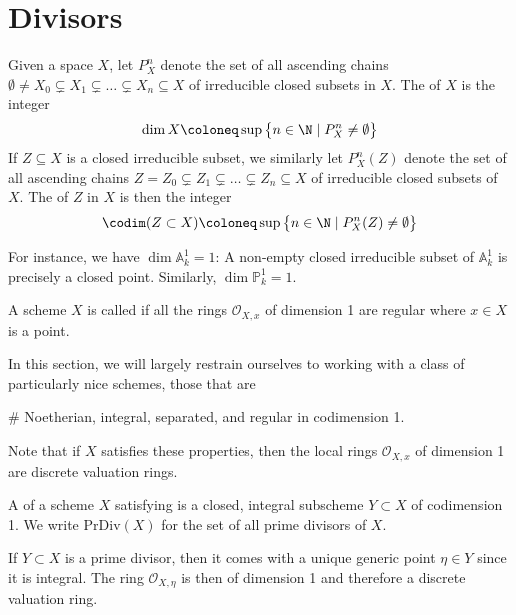 \documentclass[wip, algebra]{bsteffan-lecturenotes}
\newcommand{\cO}{\mathcal{O}}
\newcommand{\A}{\mathbb{A}}
\renewcommand{\P}{\mathbb{P}}
\newcommand{\PrDiv}{\mathrm{PrDiv}}
\begin{document}
\section{Divisors}
\begin{definition}
	Given a space $X$, let $P_X^n$ denote the set of all ascending chains $\emptyset \neq X_0 \subsetneq X_1 \subsetneq \ldots \subsetneq X_n \subseteq X$ of irreducible closed subsets in $X$.  
	The  of $X$ is the integer
	\begin{equation*}
		\dim X \coloneq \sup \big\{n \in \N \mid P^n_X \neq \emptyset\big\}
	\end{equation*}
	If $Z \subseteq X$ is a closed irreducible subset, we similarly let $P_X^n(Z)$ denote the set of all ascending chains $Z = Z_0 \subsetneq Z_1 \subsetneq \ldots \subsetneq Z_n \subseteq X$ of irreducible closed subsets of $X$.
	The  of $Z$ in $X$ is then the integer
	\begin{equation*}
		\codim(Z \subset X) \coloneq \sup \big\{n \in \N \mid P^n_X(Z) \neq \emptyset\big\}
	\end{equation*}
\end{definition}
For instance, we have $\dim \A^1_k = 1$: A non-empty closed irreducible subset of $\A^1_k$ is precisely a closed point.
Similarly, $\dim \P^1_k = 1$.
\begin{definition}
	A scheme $X$ is called  if all the rings $\cO_{X, x}$ of dimension 1 are regular where $x \in X$ is a point.
\end{definition}
In this section, we will largely restrain ourselves to working with a class of particularly nice schemes, those that are\textellipsis{}
\begin{alphanumerate}
	\item[\#]\label{ass:divs:standard} Noetherian, integral, separated, and regular in codimension 1.
\end{alphanumerate}
Note that if $X$ satisfies these properties, then the local rings $\cO_{X, x}$ of dimension 1 are discrete valuation rings.
\begin{definition}
	A  of a scheme $X$ satisfying  is a closed, integral subscheme $Y \subset X$ of codimension 1.
	We write $\PrDiv(X)$ for the set of all prime divisors of $X$.
\end{definition}
If $Y \subset X$ is a prime divisor, then it comes with a unique generic point $\eta \in Y$ since it is integral.
The ring $\cO_{X, \eta}$ is then of dimension 1 and therefore a discrete valuation ring.
\end{document}
